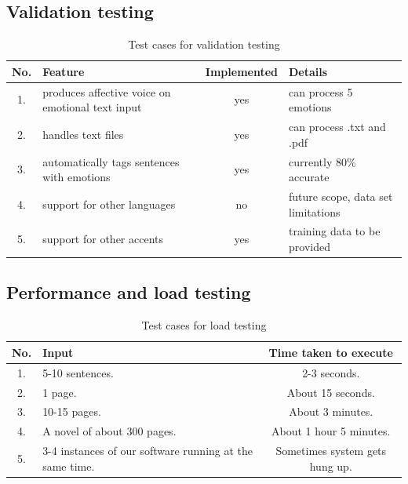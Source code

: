 \documentclass[oneside,a4paper,12pt]{book}
\begin{document}
\begin{appendices}
\subsection{Validation testing}   
\begin{table}[!htbp]
	\def\arraystretch{1.5}
	\begin{tabularx}{\textwidth}{|c|X|c|X|}
		\hline 
		No. & Feature	& Implemented & Details \\ \hline
		1. & produces affective voice on emotional text input & yes & can process 5 emotions \\ \hline
		2. & handles text files & yes & can process .txt and .pdf \\ \hline
		3. & automatically tags sentences with emotions & yes & currently 80\% accurate \\ \hline
		4. & support for other languages & no & future scope, data set limitations \\ \hline
		5. & support for other accents & yes & training data to be provided \\ \hline
	\end{tabularx}
	\caption{Test cases for validation testing}
	\label{tab:testcases}
\end{table}

\subsection{Performance and load testing}   
\begin{table}[!htbp]
	\def\arraystretch{1.5}
	\begin{tabularx}{\textwidth}{|c|X|c|}
		\hline 
		No. & Input	& Time taken to execute \\ \hline
		1. & 5-10 sentences. & 2-3 seconds. \\ \hline
		2. & 1 page. & About 15 seconds. \\ \hline
		3. & 10-15 pages. & About 3 minutes. \\ \hline
		4. & A novel of about 300 pages. & About 1 hour 5 minutes. \\ \hline
		5. & 3-4 instances of our software running at the same time. & Sometimes system gets hung up. \\ \hline
	\end{tabularx}
	\caption{Test cases for load testing}
	\label{tab:testcases}
\end{table}

\newpage

\end{appendices}
\end{document}
